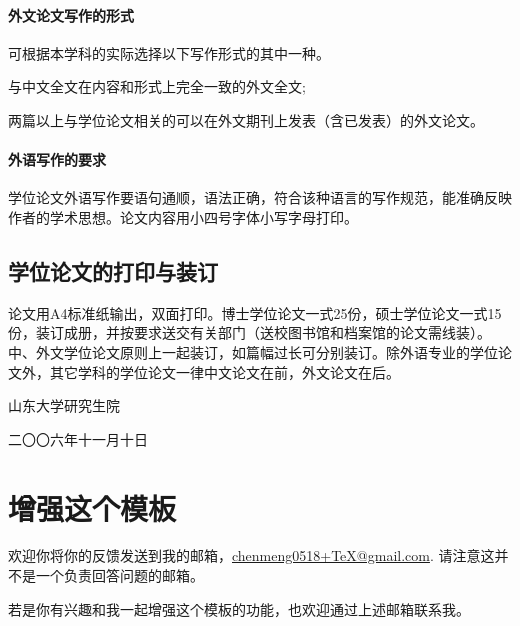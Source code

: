 \subsubsection{外文论文写作的形式}
可根据本学科的实际选择以下写作形式的其中一种。
\begin{compactenum}
\item 与中文全文在内容和形式上完全一致的外文全文;
\item 两篇以上与学位论文相关的可以在外文期刊上发表（含已发表）的外文论文。
\end{compactenum}
\subsubsection{外语写作的要求}
学位论文外语写作要语句通顺，语法正确，符合该种语言的写作规范，能准确反映作者的学术思想。论文内容用小四号字体小写字母打印。
\section{学位论文的打印与装订}
论文用A4标准纸输出，双面打印。博士学位论文一式25份，硕士学位论文一式15份，装订成册，并按要求送交有关部门（送校图书馆和档案馆的论文需线装）。中、外文学位论文原则上一起装订，如篇幅过长可分别装订。除外语专业的学位论文外，其它学科的学位论文一律中文论文在前，外文论文在后。
\vfill
\hfill\begin{minipage}{.3\textwidth}
山东大学研究生院

二〇〇六年十一月十日
\end{minipage}
\chapter{增强这个模板}
欢迎你将你的反馈发送到我的邮箱，\href{mailto:chenmeng0518+TeX@gmail.com}{chenmeng0518+TeX@gmail.com}. 请注意这并不是一个负责回答问题的邮箱。

若是你有兴趣和我一起增强这个模板的功能，也欢迎通过上述邮箱联系我。
